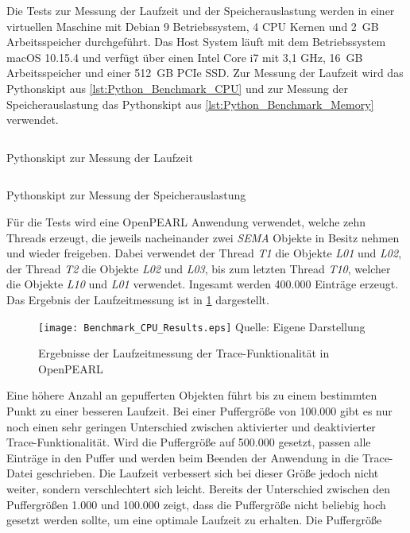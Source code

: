 Die Tests zur Messung der Laufzeit und der Speicherauslastung werden in einer
virtuellen Maschine mit Debian 9 Betriebssystem, 4 CPU Kernen und 2~GB
Arbeitsspeicher durchgeführt. Das Host System läuft mit dem Betriebssystem macOS
10.15.4 und verfügt über einen Intel Core i7 mit 3,1 GHz, 16~GB Arbeitsspeicher
und einer 512~GB PCIe SSD. Zur Messung der Laufzeit wird das Pythonskipt aus
\cref{lst:Python_Benchmark_CPU} und zur Messung der Speicherauslastung das
Pythonskipt aus \cref{lst:Python_Benchmark_Memory} verwendet.
\begin{listing}[ht]
  \inputminted[frame=lines,linenos]{python}{./Python/benchmark_cpu.py}
  \caption{Pythonskipt zur Messung der Laufzeit}
  \label{lst:Python_Benchmark_CPU}
\end{listing} 
\begin{listing}[ht]
  \inputminted[frame=lines,linenos]{python}{./Python/benchmark_memory.py}
  \caption{Pythonskipt zur Messung der Speicherauslastung}
  \label{lst:Python_Benchmark_Memory}
\end{listing}
Für die Tests wird eine OpenPEARL Anwendung verwendet, welche zehn Threads
erzeugt, die jeweils nacheinander zwei \emph{SEMA} Objekte in Besitz nehmen und
wieder freigeben. Dabei verwendet der Thread \emph{T1} die Objekte
\emph{L01} und \emph{L02}, der Thread \emph{T2} die Objekte \emph{L02}
und \emph{L03}, bis zum letzten Thread \emph{T10}, welcher die Objekte
\emph{L10} und \emph{L01} verwendet. Ingesamt werden 400.000 Einträge erzeugt.
Das Ergebnis der Laufzeitmessung ist in \cref{fig:BenchmarkCpuResults}
dargestellt. 
\begin{figure}[ht]
  \texttt{[image: Benchmark\_CPU\_Results.eps]}
  \footnotesize\sffamily Quelle: Eigene Darstellung
  \caption{Ergebnisse der Laufzeitmessung der Trace-Funktionalität in OpenPEARL}
  \label{fig:BenchmarkCpuResults}
\end{figure}
Eine höhere Anzahl an gepufferten Objekten führt bis zu einem bestimmten Punkt
zu einer besseren Laufzeit. Bei einer Puffergröße von 100.000 gibt es nur noch
einen sehr geringen Unterschied zwischen aktivierter und deaktivierter
Trace-Funktionalität. Wird die Puffergröße auf 500.000 gesetzt, passen alle
Einträge in den Puffer und werden beim Beenden der Anwendung in die Trace-Datei
geschrieben. Die Laufzeit verbessert sich bei dieser Größe jedoch nicht weiter,
sondern verschlechtert sich leicht. Bereits der Unterschied zwischen den
Puffergrößen 1.000 und 100.000 zeigt, dass die Puffergröße nicht beliebig hoch
gesetzt werden sollte, um eine optimale Laufzeit zu erhalten. Die Puffergröße
